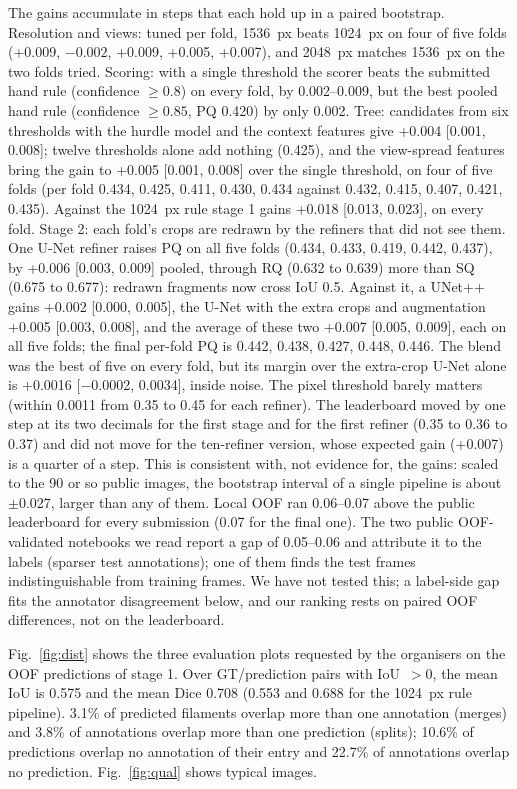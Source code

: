 \documentclass[sigconf]{acmart}
\begin{document}
The gains accumulate in steps that each hold up in a paired bootstrap. Resolution and views: tuned per fold, 1536~px beats 1024~px on four of five folds (+0.009, $-0.002$, +0.009, +0.005, +0.007), and 2048~px matches 1536~px on the two folds tried. Scoring: with a single threshold the scorer beats the submitted hand rule (confidence $\geq 0.8$) on every fold, by 0.002--0.009, but the best pooled hand rule (confidence $\geq 0.85$, PQ 0.420) by only 0.002. Tree: candidates from six thresholds with the hurdle model and the context features give +0.004 [0.001, 0.008]; twelve thresholds alone add nothing (0.425), and the view-spread features bring the gain to +0.005 [0.001, 0.008] over the single threshold, on four of five folds (per fold 0.434, 0.425, 0.411, 0.430, 0.434 against 0.432, 0.415, 0.407, 0.421, 0.435). Against the 1024~px rule stage 1 gains +0.018 [0.013, 0.023], on every fold. Stage 2: each fold's crops are redrawn by the refiners that did not see them. One U-Net refiner raises PQ on all five folds (0.434, 0.433, 0.419, 0.442, 0.437), by +0.006 [0.003, 0.009] pooled, through RQ (0.632 to 0.639) more than SQ (0.675 to 0.677): redrawn fragments now cross IoU 0.5. Against it, a UNet++ gains +0.002 [0.000, 0.005], the U-Net with the extra crops and augmentation +0.005 [0.003, 0.008], and the average of these two +0.007 [0.005, 0.009], each on all five folds; the final per-fold PQ is 0.442, 0.438, 0.427, 0.448, 0.446. The blend was the best of five on every fold, but its margin over the extra-crop U-Net alone is +0.0016 [$-$0.0002, 0.0034], inside noise. The pixel threshold barely matters (within 0.0011 from 0.35 to 0.45 for each refiner). The leaderboard moved by one step at its two decimals for the first stage and for the first refiner (0.35 to 0.36 to 0.37) and did not move for the ten-refiner version, whose expected gain (+0.007) is a quarter of a step. This is consistent with, not evidence for, the gains: scaled to the 90 or so public images, the bootstrap interval of a single pipeline is about $\pm$0.027, larger than any of them. Local OOF ran 0.06--0.07 above the public leaderboard for every submission (0.07 for the final one). The two public OOF-validated notebooks we read report a gap of 0.05--0.06 and attribute it to the labels (sparser test annotations); one of them finds the test frames indistinguishable from training frames. We have not tested this; a label-side gap fits the annotator disagreement below, and our ranking rests on paired OOF differences, not on the leaderboard.

Fig.~\ref{fig:dist} shows the three evaluation plots requested by the organisers on the OOF predictions of stage 1. Over GT/prediction pairs with IoU~$>0$, the mean IoU is 0.575 and the mean Dice 0.708 (0.553 and 0.688 for the 1024~px rule pipeline). 3.1\% of predicted filaments overlap more than one annotation (merges) and 3.8\% of annotations overlap more than one prediction (splits); 10.6\% of predictions overlap no annotation of their entry and 22.7\% of annotations overlap no prediction. Fig.~\ref{fig:qual} shows typical images.
\end{document}
